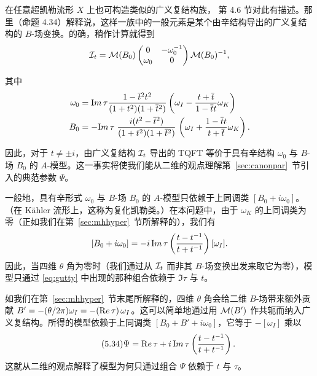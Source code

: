 在任意超凯勒流形 $X$ 上也可构造类似的广义复结构族，\cite{ref67} 第 4.6 节对此有描述。那里（命题 4.34）解释说，这样一族中的一般元素是某个由辛结构导出的广义复结构的 $B$-场变换。的确，稍作计算就得到
\setcounter{equation}{30}
\begin{equation}\label{eq:huffy}
{\cal I}_t={\cal M}(B_0)\left(\begin{matrix}0 &
-\omega_0^{-1}\\ \omega_0 & 0\\\end{matrix}\right){\cal M}(B_0)^{-1},
\end{equation}

其中 %
\setcounter{equation}{31}
\begin{equation}\label{eq:nutty}
\begin{aligned}\omega_0 & = {\rm Im}\,\tau{1-\bar
t{}^2t^2\over (1+t^2)(1+\bar t{}^2)}\left(\omega_I-{t+\bar t\over
1-\bar t t}\omega_K\right)\\
                      B_0 &= -{\rm Im}\,\tau\left.{i(t^2-\bar t{}^2)\over(1+t^2)(1+\bar
                      t{}^2)}\right.
                      \left(\omega_I+{1-\bar t t\over t+\bar t}\omega_K\right).\\\end{aligned}
\end{equation}

因此，对于 $t\neq \pm i$，由广义复结构 ${\cal I}_t$ 导出的 TQFT 等价于具有辛结构 $\omega_0$ 与 $B$-场 $B_0$ 的 $A$-模型。这一事实将使我们能从二维的观点理解第~\ref{sec:canonpar}~节引入的典范参数 $\Psi$。

一般地，具有辛形式 $\omega_0$ 与 $B$-场 $B_0$ 的 $A$-模型只依赖于上同调类 $[B_0+i\omega_0]$。（在 Kähler 流形上，这称为复化凯勒类。）在本问题中，由于 $\omega_K$ 的上同调类为零（正如我们在第~\ref{sec:mhhyper}~节所解释的），我们有 %
\setcounter{equation}{32}
\begin{equation}\label{eq:gutty}
[B_0+i\omega_0]=-i\,{\rm
Im}\,\tau\left(t-t^{-1}\over t+t^{-1}\right) [\omega_I].
\end{equation}
因此，当四维 $\theta$ 角为零时（我们通过从 ${\cal I}_t$ 而非其 $B$-场变换出发来取它为零），模型只通过 \eqref{eq:gutty} 中出现的那种组合依赖于 ${\Im}\tau$ 与 $t$。

如我们在第~\ref{sec:mhhyper}~节末尾所解释的，四维 $\theta$ 角会给二维 $B$-场带来额外贡献 $B'=-(\theta/2\pi)\omega_I=-({\rm Re}\,\tau)\,\omega_I$。这可以简单地通过用 ${\cal M}(B')$ 作共轭而纳入广义复结构。所得的模型依赖于上同调类 $[B_0+B'+i\omega_0]$，它等于 $-[\omega_I]$ 乘以
\begin{equation*}
\tag*{(5.34)}
\Psi={\rm Re}\,\tau +i\,{\rm Im}\,\tau
\left(t-t^{-1}\over t+t^{-1}\right).
\end{equation*}
这就从二维的观点解释了模型为何只通过组合 $\Psi$ 依赖于 $t$ 与 $\tau$。

